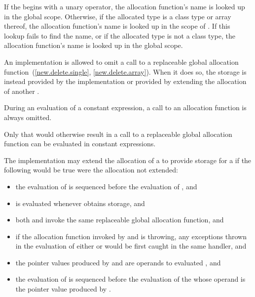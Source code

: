 \pnum
{}%
If the  begins with a unary \tcode{::}
operator, the allocation function's name is looked up in the global
scope. Otherwise, if the allocated type is a class type  or
array thereof, the allocation function's name is looked up in the scope
of . If this lookup fails to find the name, or if the allocated
type is not a class type, the allocation function's name is looked up in
the global scope.

\pnum
An implementation is allowed to omit a call to a replaceable global allocation
function~(\ref{new.delete.single}, \ref{new.delete.array}). When it does so,
the storage is instead provided by the implementation or provided by extending
the allocation of another .

\pnum
During an evaluation of a constant expression,
a call to an allocation function is always omitted.
\begin{note}
Only  that would otherwise result in
a call to a replaceable global allocation function
can be evaluated in constant expressions.
\end{note}

\pnum
The implementation may
extend the allocation of a   to provide
storage for a   if the
following would be true were the allocation not extended:
\begin{itemize}
\item the evaluation of  is sequenced before the evaluation of
, and

\item {} is evaluated whenever  obtains storage, and

\item both  and  invoke the same replaceable global
allocation function, and

\item if the allocation function invoked by  and  is
throwing, any exceptions thrown in the evaluation of either  or
 would be first caught in the same handler, and

\item the pointer values produced by  and  are operands to
evaluated , and

\item the evaluation of  is sequenced before the evaluation of the
 whose operand is the pointer value produced
by .
\end{itemize}

